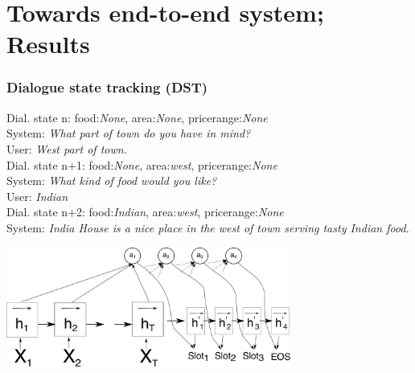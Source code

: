 \documentclass[10pt, compress,british,xcolor={svgnames,dvipsnames,x11names},trans]{beamer}
\def\area#1{{\color{darkgreen}area:\it #1}}
\def\food#1#2{{Dial. state #1: \color{blue}food:\it #2}}
\def\pricerange#1{{\color{orange}pricerange:\it #1}}
\def\sys#1{{\color{purple}System: \it #1}}
\def\usr#1{{\color{brown}User: \it #1}}
\begin{document}
\section{Towards end-to-end system; Results}  %


\begin{frame}\frametitle{Dialogue state tracking (DST)}
    \food{n}{None}, \area{None}, \pricerange{None} \\
    \sys{What part of town do you have in mind?} \\
    \usr{West part of town.} \\
    \food{n+1}{None}, \area{west}, \pricerange{None} \\
    \sys{What kind of food would you like?} \\
    \usr{Indian} \\
    \food{n+2}{Indian}, \area{west}, \pricerange{None} \\
    \sys{India House is a nice place in the west of town serving tasty Indian food.} \\
    \begin{center}
        \includegraphics[width=0.7\textwidth]{encdec}
    \end{center}
\end{frame}
\end{document}
